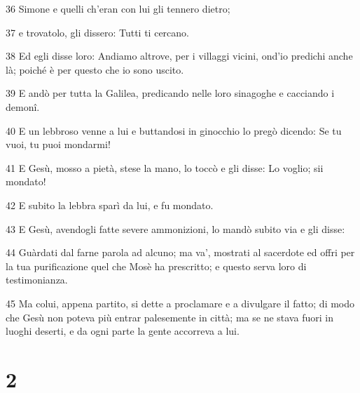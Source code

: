\par 36 Simone e quelli ch'eran con lui gli tennero dietro;
\par 37 e trovatolo, gli dissero: Tutti ti cercano.
\par 38 Ed egli disse loro: Andiamo altrove, per i villaggi vicini, ond'io predichi anche là; poiché è per questo che io sono uscito.
\par 39 E andò per tutta la Galilea, predicando nelle loro sinagoghe e cacciando i demonî.
\par 40 E un lebbroso venne a lui e buttandosi in ginocchio lo pregò dicendo: Se tu vuoi, tu puoi mondarmi!
\par 41 E Gesù, mosso a pietà, stese la mano, lo toccò e gli disse: Lo voglio; sii mondato!
\par 42 E subito la lebbra sparì da lui, e fu mondato.
\par 43 E Gesù, avendogli fatte severe ammonizioni, lo mandò subito via e gli disse:
\par 44 Guàrdati dal farne parola ad alcuno; ma va', mostrati al sacerdote ed offri per la tua purificazione quel che Mosè ha prescritto; e questo serva loro di testimonianza.
\par 45 Ma colui, appena partito, si dette a proclamare e a divulgare il fatto; di modo che Gesù non poteva più entrar palesemente in città; ma se ne stava fuori in luoghi deserti, e da ogni parte la gente accorreva a lui.

\chapter{2}

